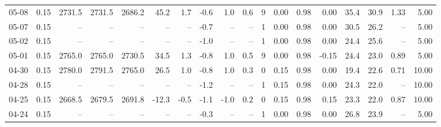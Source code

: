\begin{threeparttable}
{\begin{tabular}{lrrrrrrrrrrrrrrrrr}
  05-08 &     0.15 & 2731.5 & 2731.5 & 2686.2 &       45.2 &            1.7 &                      -0.6 &                      1.0 &                 0.6 &              9 &       0.00 &      0.98 &           0.00 &             35.4 &                30.9 &            1.33 &                   5.00 \\
  05-07 &     0.15 &     -- &     -- &     -- &         -- &             -- &                      -0.7 &                       -- &                  -- &              1 &       0.00 &      0.98 &           0.00 &             30.5 &                26.2 &              -- &                   5.00 \\
  05-02 &     0.15 &     -- &     -- &     -- &         -- &             -- &                      -1.0 &                       -- &                  -- &              1 &       0.00 &      0.98 &           0.00 &             24.4 &                25.6 &              -- &                   5.00 \\
  05-01 &     0.15 & 2765.0 & 2765.0 & 2730.5 &       34.5 &            1.3 &                      -0.8 &                      1.0 &                 0.5 &              9 &       0.00 &      0.98 &          -0.15 &             24.4 &                23.0 &            0.89 &                   5.00 \\
  04-30 &     0.15 & 2780.0 & 2791.5 & 2765.0 &       26.5 &            1.0 &                      -0.8 &                      1.0 &                 0.3 &              0 &       0.15 &      0.98 &           0.00 &             19.4 &                22.6 &            0.71 &                  10.00 \\
  04-28 &     0.15 &     -- &     -- &     -- &         -- &             -- &                      -1.2 &                       -- &                  -- &              1 &       0.15 &      0.98 &           0.00 &             24.3 &                22.0 &              -- &                  10.00 \\
  04-25 &     0.15 & 2668.5 & 2679.5 & 2691.8 &      -12.3 &           -0.5 &                      -1.1 &                     -1.0 &                 0.2 &              0 &       0.15 &      0.98 &           0.15 &             23.3 &                22.0 &            0.87 &                  10.00 \\
  04-24 &     0.15 &     -- &     -- &     -- &         -- &             -- &                      -0.3 &                       -- &                  -- &              1 &       0.00 &      0.98 &           0.00 &             26.8 &                23.9 &              -- &                   5.00 \\

\end{tabular}}
\end{threeparttable}
